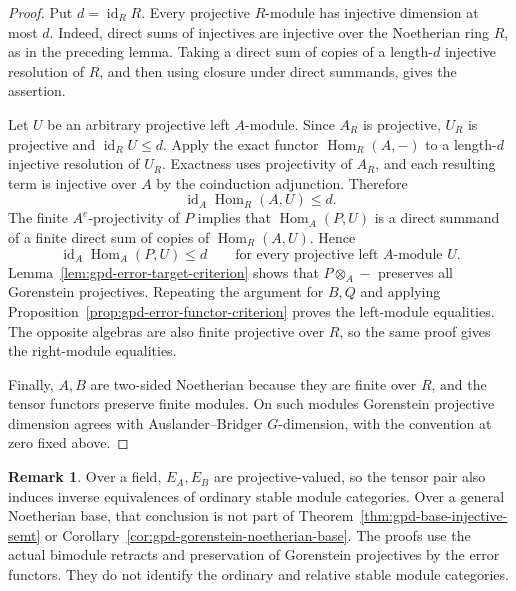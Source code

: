 \documentclass[12pt,a4paper,english,reqno]{amsart}
\numberwithin{equation}{section}
\theoremstyle{plain}
\theoremstyle{definition}
\newtheorem{remark}[theorem]{Remark}
\begin{document}
\begin{proof}
Put $d=\operatorname{id}_R R$.  Every projective $R$-module has
injective dimension at most $d$.  Indeed, direct sums of injectives
are injective over the Noetherian ring $R$, as in the preceding
lemma.  Taking a direct sum of copies of a length-$d$ injective
resolution of $R$, and then using closure under direct summands,
gives the assertion.

Let $U$ be an arbitrary projective left $A$-module.  Since $A_R$ is
projective, $U_R$ is projective and
$\operatorname{id}_R U\leq d$.  Apply the exact functor
$\operatorname{Hom}_R(A,-)$ to a length-$d$ injective resolution of
$U_R$.  Exactness uses projectivity of $A_R$, and each resulting
term is injective over $A$ by the coinduction adjunction.  Therefore
\[
 \operatorname{id}_A\operatorname{Hom}_R(A,U)\leq d .
\]
The finite $A^e$-projectivity of $P$ implies that
$\operatorname{Hom}_A(P,U)$ is a direct summand of a finite direct
sum of copies of $\operatorname{Hom}_R(A,U)$.  Hence
\[
 \operatorname{id}_A\operatorname{Hom}_A(P,U)\leq d
 \qquad\text{for every projective left $A$-module $U$}.
\]
Lemma~\ref{lem:gpd-error-target-criterion} shows that
$P\otimes_A-$ preserves all Gorenstein projectives.  Repeating the
argument for $B,Q$ and applying
Proposition~\ref{prop:gpd-error-functor-criterion} proves the
left-module equalities.  The opposite algebras are also finite
projective over $R$, so the same proof gives the right-module
equalities.

Finally, $A,B$ are two-sided Noetherian because they are finite over
$R$, and the tensor functors preserve finite modules.  On such
modules Gorenstein projective dimension agrees with
Auslander--Bridger $G$-dimension, with the convention at zero fixed
above.
\end{proof}

\begin{remark}
\label{rem:gpd-ordinary-versus-relative}
Over a field, $E_A,E_B$ are projective-valued, so the tensor pair also
induces inverse equivalences of ordinary stable module categories.
Over a general Noetherian base, that conclusion is not part of
Theorem~\ref{thm:gpd-base-injective-semt} or
Corollary~\ref{cor:gpd-gorenstein-noetherian-base}.  The proofs use
the actual bimodule retracts and preservation of Gorenstein
projectives by the error functors.  They do not identify the
ordinary and relative stable module categories.
\end{remark}
\end{document}
